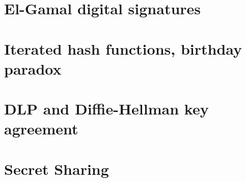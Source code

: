 \documentclass{article}
\begin{document}
\section{El-Gamal digital signatures}

\clearpage

\section{Iterated hash functions, birthday paradox}

\clearpage

\section{DLP and Diffie-Hellman key agreement}

\clearpage

\section{Secret Sharing}

\end{document}
